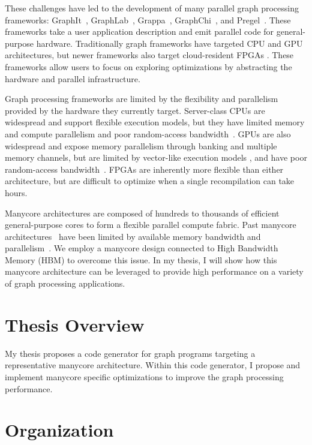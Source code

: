 These challenges have led to the development of many parallel graph processing frameworks: GraphIt~\cite{zhang2018graphit}, GraphLab~\cite{low2010graphlab, low2012distributed}, Grappa~\cite{nelson2015grappa}, GraphChi~\cite{aapo2012graphchi}, and Pregel~\cite{malewicz2010pregel}. 
These frameworks take a user application description and emit parallel code for general-purpose hardware.
Traditionally graph frameworks have targeted CPU and GPU architectures, but newer frameworks also target cloud-resident FPGAs \cite{engelhardt2016gravf, dai2016fpgp}.
These frameworks allow users to focus on exploring optimizations by abstracting the hardware and parallel infrastructure.

Graph processing frameworks are limited by the flexibility and parallelism provided by the hardware they currently target.
Server-class CPUs are widespread and support flexible execution models, but they have limited memory and compute parallelism and poor random-access bandwidth~\citep{beamer2015locality}.
GPUs are also widespread and expose memory parallelism through banking and multiple memory channels, but are limited by vector-like execution models \cite{xu2014graph, shi2018graph}, and have poor random-access bandwidth~\citep{aamodt2018general}.
FPGAs are inherently more flexible than either architecture, but are difficult to optimize when a single recompilation can take hours. 
  
Manycore architectures are composed of hundreds to thousands of efficient general-purpose cores to form a flexible parallel compute fabric.
Past manycore architectures~\cite{ramey2011tilera, agathos2015parallela, gwennap2011adapteva} have been limited by available memory bandwidth and parallelism~\citep{loi2010efficient}.  We employ a manycore design connected to High Bandwidth Memory (HBM) \cite{jedec2020hbm, jouppi2017datacenter} to overcome this issue.
In my thesis, I will show how this manycore architecture can be leveraged to provide high performance on a variety of graph processing applications.


\section{Thesis Overview}
My thesis proposes a code generator for graph programs targeting a representative manycore architecture. 
Within this code generator, I propose and implement manycore specific optimizations to improve the graph processing performance. 
\section{Organization}

